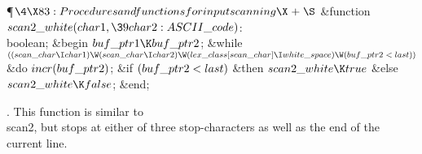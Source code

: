 \Y\P$\4\X83:Procedures and functions for input scanning\X\mathrel{+}\S$\6
\4\&{function}\1\  $\\{scan2\_white}(\\{char1},\39\\{char2}:\\{ASCII%
\_code})$: \\{boolean};\2\6
\&{begin} $\\{buf\_ptr1}\K\\{buf\_ptr2}$;\6
\&{while} $((\\{scan\_char}\I\\{char1})\W(\\{scan\_char}\I\\{char2})\W(\\{lex%
\_class}[\\{scan\_char}]\I\\{white\_space})\W(\\{buf\_ptr2}<\\{last}))$ \1%
\&{do}\5
$\\{incr}(\\{buf\_ptr2})$;\2\6
\&{if} $(\\{buf\_ptr2}<\\{last})$ \1\&{then}\5
$\\{scan2\_white}\K\\{true}$\6
\4\&{else} $\\{scan2\_white}\K\\{false}$;\2\6
\&{end};\par
\fi

.
This function is similar to \\{scan2}, but stops at either of three
stop-characters as well as the end of the current line.

